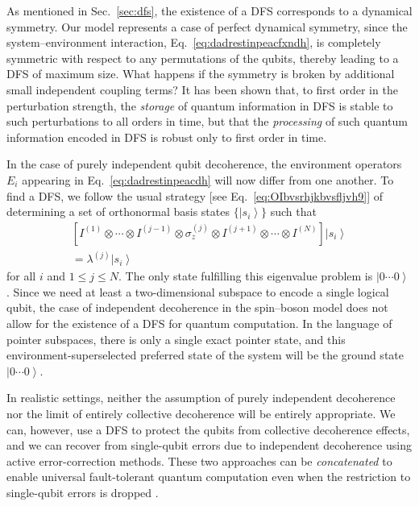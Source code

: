 \documentclass[aps,pra,reprint,amsmath,amssymb,showpacs,nofootinbib,floatfix,onecolumn,12pt]{revtex4-1}
\newcommand{\ket}[1]{\left\vert{#1}\right\rangle}
\begin{document}
As mentioned in Sec.~\ref{sec:dfs}, the existence of a DFS corresponds to a dynamical symmetry. Our model represents a case of perfect dynamical symmetry, since the system--environment interaction, Eq.~\eqref{eq:dadrestinpeacfxndh}, is completely symmetric with respect to any permutations of the qubits, thereby leading to a DFS of maximum size. What happens if the symmetry is broken by additional small independent coupling terms? It has been shown \cite{Lidar:1998:uu,Bacon:1999:aq} that, to first order in the perturbation strength, the \emph{storage} of quantum information in DFS is stable to such perturbations to all orders in time, but that the \emph{processing} of such quantum information encoded in DFS is robust only to first order in time. 

In the case of purely independent qubit decoherence, the environment operators $E_i$ appearing in Eq.~\eqref{eq:dadrestinpeacdh} will now differ from one another. To find a DFS, we follow the usual strategy [see Eq.~\eqref{eq:OIbvsrhjkbvsfljvh9}] of determining a set of orthonormal basis states $\{ \ket{s_i} \}$ such that
%
\begin{multline}
  \label{eq:16}
  \left[ I^{(1)} \otimes \cdots \otimes I^{(j-1)} \otimes
    \sigma_z^{(j)} \otimes I^{(j+1)} \otimes \cdots
    \otimes I^{(N)} \right] \ket{s_i}\\ = \lambda^{(j)} \ket{s_i} 
\end{multline}
%
for all $i$ and $1 \le j \le N$. The only state fulfilling this eigenvalue problem is $\ket{0\cdots 0}$. Since we need at least a two-dimensional subspace to encode a single logical qubit, the case of independent decoherence in the spin--boson model does not allow for the existence of a DFS for quantum computation. In the language of pointer subspaces, there is only a single exact pointer state, and this environment-superselected preferred state of the system will be the ground state $\ket{0\cdots 0}$.

In realistic settings, neither the assumption of purely independent decoherence nor the limit of entirely collective decoherence will be entirely appropriate. We can, however, use a DFS to protect the qubits from collective decoherence effects, and we can recover from single-qubit errors due to independent decoherence using active error-correction methods. These two approaches can be \emph{concatenated} \cite{Lidar:1999:fa} to enable universal fault-tolerant quantum computation even when the restriction to single-qubit errors is dropped \cite{Bacon:2000:yy,Lidar:2001:oo}.
\end{document}
